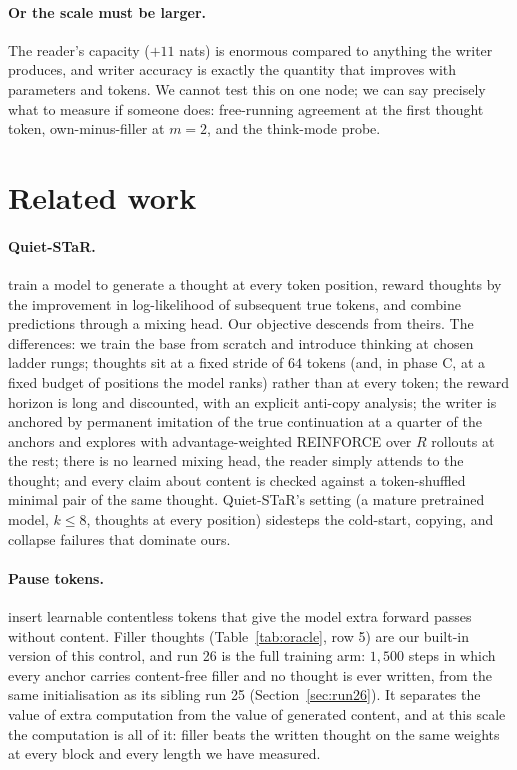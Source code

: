 \documentclass{article} %
\begin{document}
\paragraph{Or the scale must be larger.} The reader's capacity ($+11$ nats) is enormous compared to anything the writer produces, and writer accuracy is exactly the quantity that improves with parameters and tokens. We cannot test this on one node; we can say precisely what to measure if someone does: free-running agreement at the first thought token, own-minus-filler at $m=2$, and the think-mode probe.

\section{Related work}
\label{sec:related}

\paragraph{Quiet-STaR.} \citet{zelikman2024quietstar} train a model to generate a thought at every token position, reward thoughts by the improvement in log-likelihood of subsequent true tokens, and combine predictions through a mixing head. Our objective descends from theirs. The differences: we train the base from scratch and introduce thinking at chosen ladder rungs; thoughts sit at a fixed stride of $64$ tokens (and, in phase C, at a fixed budget of positions the model ranks) rather than at every token; the reward horizon is long and discounted, with an explicit anti-copy analysis; the writer is anchored by permanent imitation of the true continuation at a quarter of the anchors and explores with advantage-weighted REINFORCE over $R$ rollouts at the rest; there is no learned mixing head, the reader simply attends to the thought; and every claim about content is checked against a token-shuffled minimal pair of the same thought. Quiet-STaR's setting (a mature pretrained model, $k \le 8$, thoughts at every position) sidesteps the cold-start, copying, and collapse failures that dominate ours.

\paragraph{Pause tokens.} \citet{goyal2024think} insert learnable contentless tokens that give the model extra forward passes without content. Filler thoughts (Table~\ref{tab:oracle}, row 5) are our built-in version of this control, and run 26 is the full training arm: $1{,}500$ steps in which every anchor carries content-free filler and no thought is ever written, from the same initialisation as its sibling run 25 (Section~\ref{sec:run26}). It separates the value of extra computation from the value of generated content, and at this scale the computation is all of it: filler beats the written thought on the same weights at every block and every length we have measured.
\end{document}
